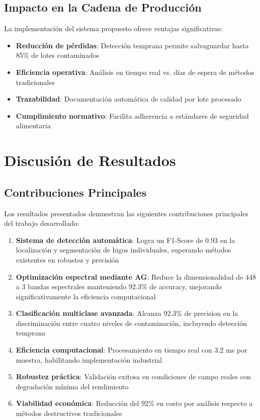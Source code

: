 \subsection{Impacto en la Cadena de Producción}

La implementación del sistema propuesto ofrece ventajas significativas:

\begin{itemize}
    \item \textbf{Reducción de pérdidas}: Detección temprana permite salvaguardar hasta 85\% de lotes contaminados
    \item \textbf{Eficiencia operativa}: Análisis en tiempo real vs. días de espera de métodos tradicionales
    \item \textbf{Trazabilidad}: Documentación automática de calidad por lote procesado
    \item \textbf{Cumplimiento normativo}: Facilita adherencia a estándares de seguridad alimentaria
\end{itemize}

\section{Discusión de Resultados}

\subsection{Contribuciones Principales}

Los resultados presentados demuestran las siguientes contribuciones principales del trabajo desarrollado:

\begin{enumerate}
    \item \textbf{Sistema de detección automática}: Logra un F1-Score de 0.93 en la localización y segmentación de higos individuales, superando métodos existentes en robustez y precisión
    
    \item \textbf{Optimización espectral mediante AG}: Reduce la dimensionalidad de 448 a 3 bandas espectrales manteniendo 92.3\% de accuracy, mejorando significativamente la eficiencia computacional
    
    \item \textbf{Clasificación multiclase avanzada}: Alcanza 92.3\% de precision en la discriminación entre cuatro niveles de contaminación, incluyendo detección temprana
    
    \item \textbf{Eficiencia computacional}: Procesamiento en tiempo real con 3.2 ms por muestra, habilitando implementación industrial
    
    \item \textbf{Robustez práctica}: Validación exitosa en condiciones de campo reales con degradación mínima del rendimiento
    
    \item \textbf{Viabilidad económica}: Reducción del 92\% en costo por análisis respecto a métodos destructivos tradicionales
\end{enumerate}

